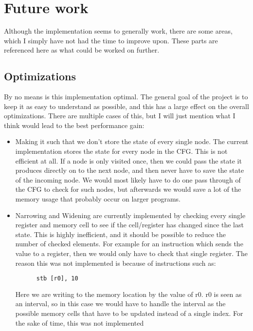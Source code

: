 \section{Future work}
Although the implementation seems to generally work, there are some areas,
which I simply have not had the time to improve upon. These parts are
referenced here as what could be worked on further.

\subsection{Optimizations}
By no means is this implementation optimal. The general goal of the project is
to keep it as easy to understand as possible, and this has a large effect on
the overall optimizations. There are multiple cases of this, but I will just
mention what I think would lead to the best performance gain:

\begin{itemize}
  \item Making it such that we don't store the state of every single node. The
    current implementation stores the state for every node in the CFG. This is
    not efficient at all. If a node is only visited once, then we could pass
    the state it produces directly on to the next node, and then never have to
    save the state of the incoming node. We would most likely have to do one
    pass through of the CFG to check for such nodes, but afterwards we would
    save a lot of the memory usage that probably occur on larger programs.
  \item Narrowing and Widening are currently implemented by checking every
    single register and memory cell to see if the cell/register has changed
    since the last state. This is highly inefficient, and it should be possible
    to reduce the number of checked elements. For example for an instruction
    which sends the value to a register, then we would only have to check that
    single register. The reason this was not implemented is because of instructions such as:
    \begin{verbatim}
      stb [r0], 10
    \end{verbatim}
    Here we are writing to the memory location by the value of r0. r0 is seen
    as an interval, so in this case we would have to handle the interval as the
    possible memory cells that have to be updated instead of a single index.
    For the sake of time, this was not implemented
\end{itemize}


